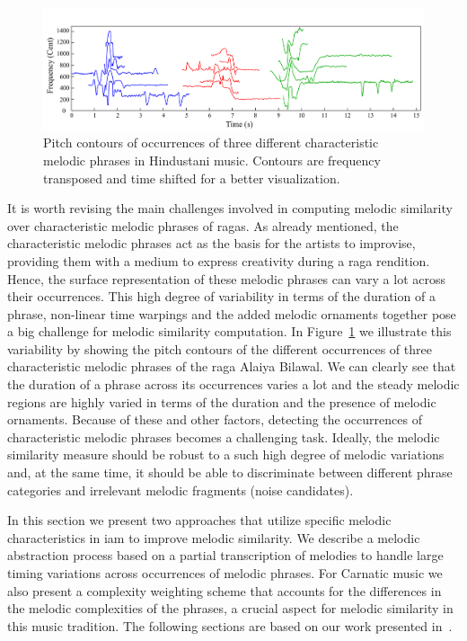 \begin{figure}
	\begin{center}
		\includegraphics[width=\figSizeHundred]{ch06_patterns/figures/ImprovingSimilarity/phraseClassesExample.pdf}
	\end{center}
	\caption{Pitch contours of occurrences of three different characteristic melodic phrases in Hindustani music. Contours are frequency transposed and time shifted for a better visualization.}
	\label{fig:phraseComplexityExample}
\end{figure}

It is worth revising the main challenges involved in computing melodic similarity over characteristic melodic phrases of \glspl{raga}. As already mentioned, the characteristic melodic phrases act as the basis for the artists to improvise, providing them with a medium to express creativity during a \gls{raga} rendition. Hence, the surface representation of these melodic phrases can vary a lot across their occurrences. This high degree of variability in terms of the duration of a phrase, non-linear time warpings and the added melodic ornaments together pose a big challenge for melodic similarity computation. In Figure~\ref{fig:phraseComplexityExample} we illustrate this variability by showing the pitch contours of the different occurrences of three characteristic melodic phrases of the \gls{raga} Alaiya Bilawal. We can clearly see that the duration of a phrase across its occurrences varies a lot and the steady melodic regions are highly varied in terms of the duration and the presence of melodic ornaments. Because of these and other factors, detecting the occurrences of characteristic melodic phrases becomes a challenging task. Ideally, the melodic similarity measure should be robust to a such high degree of melodic variations and, at the same time, it should be able to discriminate between different phrase categories and irrelevant melodic fragments (noise candidates).

In this section we present two approaches that utilize specific melodic characteristics in \gls{iam} to improve melodic similarity. We describe a melodic abstraction process based on a partial transcription of melodies to handle large timing variations across occurrences of melodic phrases. For Carnatic music we also present a complexity weighting scheme that accounts for the differences in the melodic complexities of the phrases, a crucial aspect for melodic similarity in this music tradition. The following sections are based on our work presented in~\cite{gulati_ISMIR_2015}.


